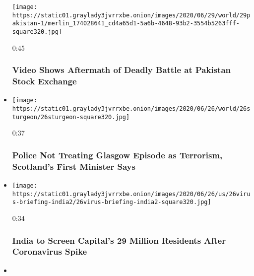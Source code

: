 \begin{itemize}
  \texttt{[image: https://static01.graylady3jvrrxbe.onion/images/2020/06/29/world/29pakistan-1/merlin\_174028641\_cd4a65d1-5a6b-4648-93b2-3554b5263fff-square320.jpg]}

  0:45

  \hypertarget{video-shows-aftermath-of-deadly-battle-at-pakistan-stock-exchange}{%
  \subsubsection{Video Shows Aftermath of Deadly Battle at Pakistan
  Stock
  Exchange}\label{video-shows-aftermath-of-deadly-battle-at-pakistan-stock-exchange}}
\item
  \href{https://www.nytimes3xbfgragh.onion/video/us/100000007212234/nicola-sturgeon-glasgow-attack.html?action=click\&module=video-series-bar\&region=header\&pgtype=Article\&playlistId=video/world}{}

  \texttt{[image: https://static01.graylady3jvrrxbe.onion/images/2020/06/26/world/26sturgeon/26sturgeon-square320.jpg]}

  0:37

  \hypertarget{police-not-treating-glasgow-episode-as-terrorism-scotlands-first-minister-says}{%
  \subsubsection{Police Not Treating Glasgow Episode as Terrorism,
  Scotland's First Minister
  Says}\label{police-not-treating-glasgow-episode-as-terrorism-scotlands-first-minister-says}}
\item
  \href{https://www.nytimes3xbfgragh.onion/video/us/100000007212150/new-delhi-coronavirus-tests.html?action=click\&module=video-series-bar\&region=header\&pgtype=Article\&playlistId=video/world}{}

  \texttt{[image: https://static01.graylady3jvrrxbe.onion/images/2020/06/26/us/26virus-briefing-india2/26virus-briefing-india2-square320.jpg]}

  0:34

  \hypertarget{india-to-screen-capitals-29-million-residents-after-coronavirus-spike}{%
  \subsubsection{India to Screen Capital's 29 Million Residents After
  Coronavirus
  Spike}\label{india-to-screen-capitals-29-million-residents-after-coronavirus-spike}}
\item
  \href{https://www.nytimes3xbfgragh.onion/video/us/100000007210500/germany-spike-coronavirus-cases.html?action=click\&module=video-series-bar\&region=header\&pgtype=Article\&playlistId=video/world}{}


\end{itemize}
